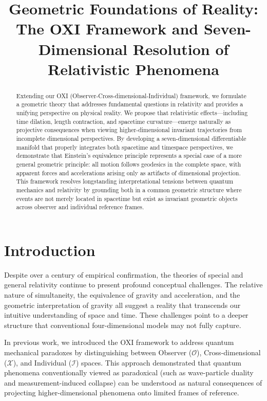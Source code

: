 \documentclass{article}
\begin{document}
\title{Geometric Foundations of Reality: \\
The OXI Framework and Seven-Dimensional Resolution of Relativistic Phenomena}
\author{}
\date{}

\maketitle

\begin{abstract}
Extending our OXI (Observer-Cross-dimensional-Individual) framework, we formulate a geometric theory that addresses fundamental questions in relativity and provides a unifying perspective on physical reality. We propose that relativistic effects—including time dilation, length contraction, and spacetime curvature—emerge naturally as projective consequences when viewing higher-dimensional invariant trajectories from incomplete dimensional perspectives. By developing a seven-dimensional differentiable manifold that properly integrates both spacetime and timespace perspectives, we demonstrate that Einstein's equivalence principle represents a special case of a more general geometric principle: all motion follows geodesics in the complete space, with apparent forces and accelerations arising only as artifacts of dimensional projection. This framework resolves longstanding interpretational tensions between quantum mechanics and relativity by grounding both in a common geometric structure where events are not merely located in spacetime but exist as invariant geometric objects across observer and individual reference frames.
\end{abstract}

\section{Introduction}

Despite over a century of empirical confirmation, the theories of special and general relativity continue to present profound conceptual challenges. The relative nature of simultaneity, the equivalence of gravity and acceleration, and the geometric interpretation of gravity all suggest a reality that transcends our intuitive understanding of space and time. These challenges point to a deeper structure that conventional four-dimensional models may not fully capture.

In previous work, we introduced the OXI framework to address quantum mechanical paradoxes by distinguishing between Observer ($\mathcal{O}$), Cross-dimensional ($\mathcal{X}$), and Individual ($\mathcal{I}$) spaces. This approach demonstrated that quantum phenomena conventionally viewed as paradoxical (such as wave-particle duality and measurement-induced collapse) can be understood as natural consequences of projecting higher-dimensional phenomena onto limited frames of reference.
\end{document}
